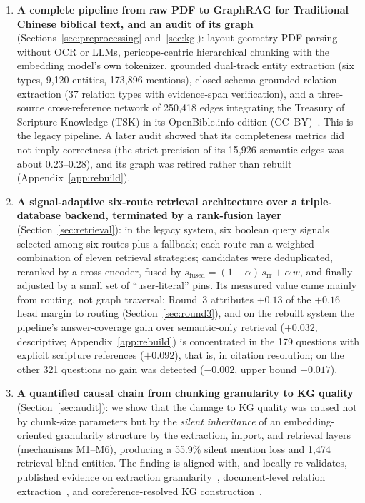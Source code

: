 \begin{enumerate}
\item \textbf{A complete pipeline from raw PDF to GraphRAG
for Traditional Chinese biblical text, and an audit of its graph}
(Sections~\ref{sec:preprocessing}
and~\ref{sec:kg}): layout-geometry PDF parsing without OCR or LLMs,
pericope-centric hierarchical chunking with the embedding model's own
tokenizer, grounded dual-track entity extraction (six types, 9{,}120
entities, 173{,}896 mentions), closed-schema grounded relation extraction
(37 relation types with evidence-span verification), and a three-source
cross-reference network of 250{,}418 edges integrating the Treasury of
Scripture Knowledge (TSK) in its OpenBible.info edition (CC~BY)~\cite{tsk}.
This is the legacy pipeline. A later audit showed that its completeness
metrics did not imply correctness (the strict precision of its 15{,}926
semantic edges was about 0.23--0.28), and its graph was retired rather
than rebuilt (Appendix~\ref{app:rebuild}).

\item \textbf{A signal-adaptive six-route retrieval architecture over a
triple-database backend, terminated by a rank-fusion layer}
(Section~\ref{sec:retrieval}): in the legacy system, six boolean query
signals selected among six routes plus a fallback; each route ran a
weighted combination of eleven retrieval strategies; candidates were
deduplicated, reranked by a cross-encoder, fused by
$s_{\mathrm{fused}}=(1-\alpha)\,s_{\mathrm{rr}}+\alpha\,w$, and finally
adjusted by a small set of ``user-literal'' pins. Its measured value came
mainly from routing, not graph traversal: Round~3 attributes $+0.13$ of the
$+0.16$ head margin to routing (Section~\ref{sec:round3}), and on the
rebuilt system the pipeline's answer-coverage gain over semantic-only
retrieval ($+0.032$, descriptive; Appendix~\ref{app:rebuild}) is
concentrated in the 179 questions with explicit scripture references
($+0.092$), that is, in citation resolution; on the other 321 questions
no gain was detected ($-0.002$, upper bound $+0.017$).

\item \textbf{A quantified causal chain from chunking granularity to KG
quality} (Section~\ref{sec:audit}): we show that the damage to KG quality
was caused not by chunk-size parameters but by the \emph{silent
inheritance} of an embedding-oriented granularity structure by the
extraction, import, and retrieval layers (mechanisms M1--M6), producing a
55.9\% silent mention loss and 1{,}474 retrieval-blind entities. The
finding is aligned with, and locally re-validates, published evidence on
extraction granularity~\cite{edge2024graphrag}, document-level relation
extraction~\cite{yao2019docred}, and coreference-resolved KG
construction~\cite{meher2025corekg,meher2025insidecorekg,meher2025linkkg}.


\end{enumerate}
